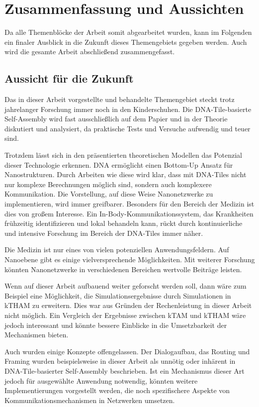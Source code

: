 \chapter{Zusammenfassung und Aussichten}
\label{cha:zusammenfassung}

Da alle Themenblöcke der Arbeit somit abgearbeitet wurden, kann im Folgenden ein finaler Ausblick in die Zukunft dieses Themengebiets gegeben werden. Auch wird die gesamte Arbeit abschließend zusammengefasst.

\section{Aussicht für die Zukunft}

Das in dieser Arbeit vorgestellte und behandelte Themengebiet steckt trotz jahrelanger Forschung immer noch in den Kinderschuhen. Die DNA-Tile-basierte Self-Assembly wird fast ausschließlich auf dem Papier und in der Theorie diskutiert und analysiert, da praktische Tests und Versuche aufwendig und teuer sind.

Trotzdem lässt sich in den präsentierten theoretischen Modellen das Potenzial dieser Technologie erkennen. DNA ermöglicht einen Bottom-Up Ansatz für Nanostrukturen. Durch Arbeiten wie diese wird klar, dass mit DNA-Tiles nicht nur komplexe Berechnungen möglich sind, sondern auch komplexere Kommunikation. Die Vorstellung, auf diese Weise Nanonetzwerke zu implementieren, wird immer greifbarer. Besonders für den Bereich der Medizin ist dies von großem Interesse. Ein In-Body-Kommunikationssystem, das Krankheiten frühzeitig identifizieren und lokal behandeln kann, rückt durch kontinuierliche und intensive Forschung im Bereich der DNA-Tiles immer näher.

Die Medizin ist nur eines von vielen potenziellen Anwendungsfeldern. Auf Nanoebene gibt es einige vielversprechende Möglichkeiten. Mit weiterer Forschung könnten Nanonetzwerke in verschiedenen Bereichen wertvolle Beiträge leisten.

Wenn auf dieser Arbeit aufbauend weiter geforscht werden soll, dann wäre zum Beispiel eine Möglichkeit, die Simulationsergebnisse durch Simulationen in kTHAM zu erweitern. Dies war aus Gründen der Rechenleistung in dieser Arbeit nicht möglich. Ein Vergleich der Ergebnisse zwischen kTAM und kTHAM wäre jedoch interessant und könnte bessere Einblicke in die Umsetzbarkeit der Mechanismen bieten. 

Auch wurden einige Konzepte offengelassen. Der Dialogaufbau, das Routing und Framing wurden beispielsweise in dieser Arbeit als unnötig oder inhärent in DNA-Tile-basierter Self-Assembly beschrieben. Ist ein Mechanismus dieser Art jedoch für ausgewählte Anwendung notwendig, könnten weitere Implementierungen vorgestellt werden, die noch spezifischere Aspekte von Kommunikationsmechanismen in Netzwerken umsetzen. 

